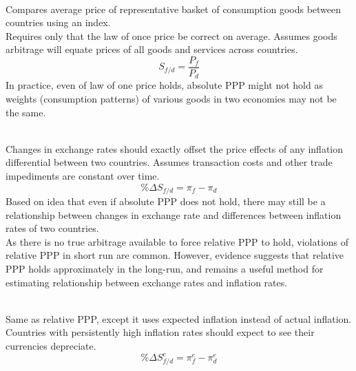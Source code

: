 \begin{definition} \\
Compares average price of representative basket of consumption goods between countries using an index.\\
Requires only that the law of once price be correct on average. Assumes goods arbitrage will equate prices of all goods and services across countries.
\begin{equation}
S_{f/d} = \frac{P_f}{P_d} \nonumber
\end{equation}
In practice, even of law of one price holds, absolute PPP might not hold as weights (consumption patterns) of various goods in two economies may not be the same.
\end{definition}

\begin{definition} \\
Changes in exchange rates should exactly offset the price effects of any inflation differential between two countries. Assumes transaction costs and other trade impediments are constant over time.
\begin{equation}
\% \Delta S_{f/d} = \pi_f - \pi_d \nonumber
\end{equation}
Based on idea that even if absolute PPP does not hold, there may still be a relationship between changes in exchange rate and differences between inflation rates of two countries.\\
As there is no true arbitrage available to force relative PPP to hold, violations of relative PPP in short run are common. However, evidence suggests that relative PPP holds approximately in the long-run, and remains a useful method for estimating relationship between exchange rates and inflation rates.
\end{definition}

\begin{definition} \\
Same as relative PPP, except it uses expected inflation instead of actual inflation.\\
Countries with persistently high inflation rates should expect to see their currencies depreciate.
\begin{equation}
\% \Delta S_{f/d}^e = \pi_f^e - \pi_d^e \nonumber
\end{equation}
\end{definition}

